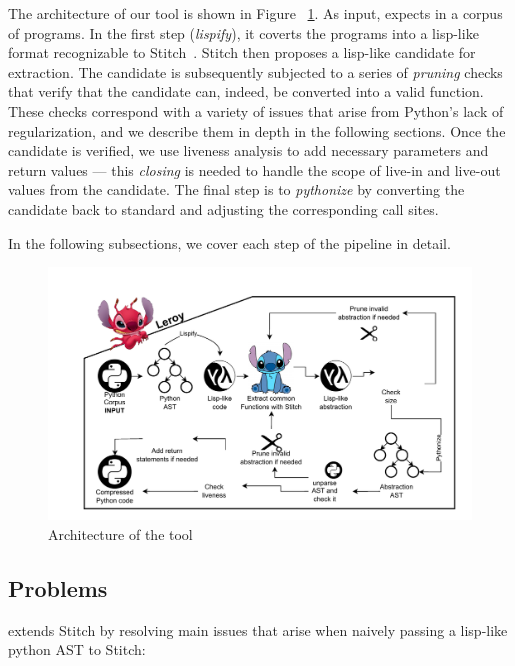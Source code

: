 The architecture of our \toolname{} tool is shown in Figure ~\ref{fig:design}. As input,
\toolname{} expects in a corpus of \ptwo{} programs.  In the first step (\emph{lispify}), it coverts the \ptwo{} programs into a lisp-like format recognizable to Stitch~\cite{Bowers_2023stitch}.  Stitch then proposes a lisp-like candidate for extraction.  The candidate is subsequently subjected to a series of \emph{pruning} checks that verify that the candidate can, indeed, be converted into a valid \ptwo{} function.  These checks correspond with a variety of issues that arise from Python's lack of regularization, and we describe them in depth in the following sections.  Once the candidate is verified, we use liveness analysis to add necessary parameters and return values --- this \emph{closing} is needed to handle the scope of live-in and live-out values from the candidate.  The final step is to \emph{pythonize} by converting the candidate back to standard \ptwo{} and adjusting the corresponding call sites.

In the following subsections, we cover each step of the \toolname{} pipeline in detail.



\begin{figure}
  \includegraphics[width=\textwidth]{images/Design2.pdf}
  \caption{Architecture of the \toolname{} tool}
  \label{fig:design}
\end{figure}

\subsection{Problems}
\toolname extends Stitch by resolving  main issues that arise when naively passing a lisp-like python AST to Stitch: 


